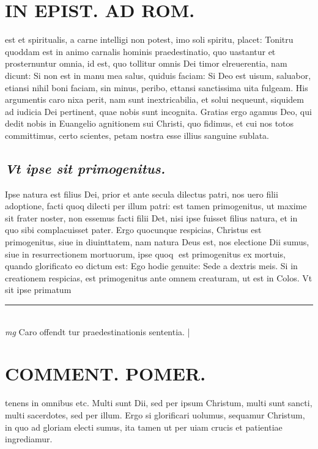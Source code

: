 \documentclass{article}
\begin{document}
\begin{pages}
\section*{IN EPIST. AD ROM.  }
\marginpar{[ p.101 ]}\pstart est et spiritualis, a carne intelligi non potest, imo soli spiritu, placet: Tonitru quoddam est in animo carnalis hominis praedestinatio, quo uastantur et prosternuntur omnia, id est, quo tollitur omnis Dei timor elreuerentia, nam dicunt: Si non est in manu mea salus, quiduis faciam: Si Deo est uisum, saluabor, etiansi nihil boni faciam, sin minus, peribo, ettansi sanctissima uita fulgeam. His argumentis caro nixa perit, nam sunt inextricabilia, et solui nequeunt, siquidem ad iudicia Dei pertinent, quae nobis sunt incognita. Gratias ergo agamus Deo, qui dedit nobis in Euangelio agnitionem sui Christi, quo fidimus, et cui nos totos committimus, certo scientes, petam nostra esse illius sanguine sublata.  \pend
{}
{}
\subsection*{\textit{Vt ipse sit primogenitus. }}\pstart Ipse natura est filius Dei, prior et ante secula dilectus patri, nos uero filii adoptione, facti quoq dilecti per illum patri: est tamen primogenitus, ut maxime sit frater noster, non essemus facti filii Det, nisi ipse fuisset filius natura, et in quo sibi complacuisset pater. Ergo quocunque respicias, Christus est primogenitus, siue in diuinttatem, nam natura Deus est, nos electione Dii sumus, siue in resurrectionem mortuorum, ipse quoq est primogenitus ex mortuis, quando glorificato eo dictum est: Ego hodie genuite: Sede a dextris meis.  Si in creationem respicias, est primogenitus ante omnem creaturam, ut est in Colos. Vt sit ipse primatum  \pend
\vspace{0.5cm}\noindent
\vspace{0.2cm}\rule{1cm}{0.2pt}\\ 
\hspace{0.2cm}\textit{mg}
\footnotesize Caro offendt tur praedestinationis sententia.  
\normalsize| 
\section*{COMMENT. POMER.  }\pstart tenens in omnibus etc. Multi sunt Dii, sed per ipsum Christum, multi sunt sancti, multi sacerdotes, sed per illum. Ergo si glorificari uolumus, sequamur Christum, in quo ad gloriam electi sumus, ita tamen ut per uiam crucis et patientiae ingrediamur.  \pend
{}
{}

\end{pages}
\end{document}
